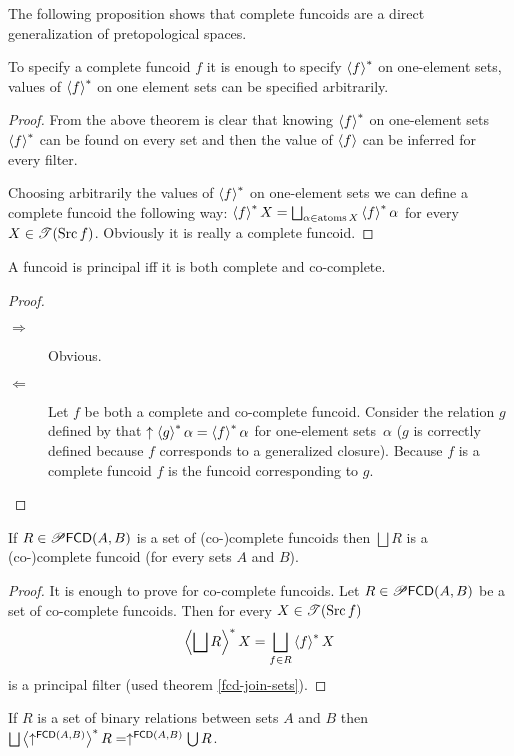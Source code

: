The following proposition shows that complete funcoids are a direct
generalization of pretopological spaces.
\begin{prop}
To specify a complete funcoid $f$ it is enough to specify $\left\langle f\right\rangle ^{\ast}$
on one-element sets, values of $\left\langle f\right\rangle ^{\ast}$ on one element sets can
be specified arbitrarily.\end{prop}
\begin{proof}
From the above theorem is clear that knowing $\left\langle f\right\rangle ^{\ast}$ on one-element
sets $\left\langle f\right\rangle ^{\ast}$ can be found on every set and then the value of
$\left\langle f\right\rangle$ can be inferred for every filter.

Choosing arbitrarily the values of $\left\langle f\right\rangle ^{\ast}$ on one-element sets
we can define a complete funcoid the following way: $\rsupfun
fX=\bigsqcup_{\alpha\in\atoms X}\rsupfun f\alpha$
for every $X\in\mathscr{T}(\operatorname{Src} f)$. Obviously it is really a complete
funcoid.\end{proof}
\begin{thm}
A funcoid is principal iff it is both complete and co-complete.\end{thm}
\begin{proof}
~
\begin{description}
\item [{$\Rightarrow$}] Obvious.
\item [{$\Leftarrow$}] Let $f$ be both a complete and co-complete funcoid.
Consider the relation $g$ defined by that $\uparrow\left\langle g\right\rangle ^{\ast}\alpha=\left\langle f\right\rangle ^{\ast}\alpha$
for one-element sets~$\alpha$ ($g$ is correctly defined because
$f$ corresponds to a generalized closure). Because $f$ is a complete
funcoid $f$ is the funcoid corresponding to $g$.
\end{description}
\end{proof}
\begin{thm}
\label{fcd-join-compl}If $R\in\mathscr{P}\mathsf{FCD}(A,B)$ is a set
of (co-)complete funcoids then $\bigsqcup R$ is a (co-)complete funcoid
(for every sets $A$ and $B$).\end{thm}
\begin{proof}
It is enough to prove for co-complete funcoids. Let
$R\in\mathscr{P}\mathsf{FCD}(A,B)$
be a set of co-complete funcoids. Then for every $X\in\mathscr{T}(\operatorname{Src} f)$
\[
\rsupfun{\bigsqcup R}X=\bigsqcup_{f\in R}\rsupfun fX
\]
is a principal filter (used theorem \ref{fcd-join-sets}).\end{proof}
\begin{cor}
\label{fcd-compl-join}If $R$ is a set of binary relations between
sets $A$ and $B$ then
$\bigsqcup\rsupfun{\uparrow^{\mathsf{FCD}(A,B)}}R=\uparrow^{\mathsf{FCD}(A,B)}
\bigcup R$.\end{cor}
